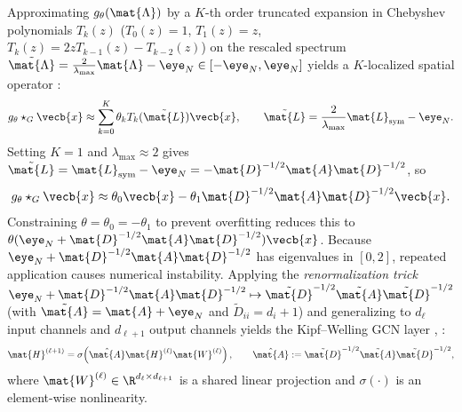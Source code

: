 \documentclass[../../../../master.tex]{subfiles}
\begin{document}
\begin{coremath}
\label{box:gnn:cheb_gcn}
Approximating $g_\theta(\mat{\Lambda})$ by a $K$-th order truncated expansion in Chebyshev polynomials $T_k(z)$ ($T_0(z)=1$, $T_1(z)=z$, $T_k(z)=2zT_{k-1}(z)-T_{k-2}(z)$) on the rescaled spectrum $\tilde{\mat{\Lambda}} = \frac{2}{\lambda_{\max}}\mat{\Lambda} - \eye_N \in [-\eye_N, \eye_N]$ yields a $K$-localized spatial operator :
\begin{equation}
  g_\theta \star_G \vecb{x} \approx \sum_{k=0}^K \theta_k T_k(\tilde{\mat{L}})\vecb{x}, \qquad \tilde{\mat{L}} = \frac{2}{\lambda_{\max}}\mat{L}_{\mathrm{sym}} - \eye_N. \label{eq:gnn:chebnet}
\end{equation}
Setting $K=1$ and $\lambda_{\max} \approx 2$ gives $\tilde{\mat{L}} = \mat{L}_{\mathrm{sym}} - \eye_N = -\mat{D}^{-1/2}\mat{A}\mat{D}^{-1/2}$, so
\begin{equation}
  g_\theta \star_G \vecb{x} \approx \theta_0 \vecb{x} - \theta_1 \mat{D}^{-1/2}\mat{A}\mat{D}^{-1/2}\vecb{x}.
\end{equation}
Constraining $\theta = \theta_0 = -\theta_1$ to prevent overfitting reduces this to $\theta(\eye_N + \mat{D}^{-1/2}\mat{A}\mat{D}^{-1/2})\vecb{x}$. Because $\eye_N + \mat{D}^{-1/2}\mat{A}\mat{D}^{-1/2}$ has eigenvalues in $[0, 2]$, repeated application causes numerical instability. Applying the \emph{renormalization trick} $\eye_N + \mat{D}^{-1/2}\mat{A}\mat{D}^{-1/2} \mapsto \tilde{\mat{D}}^{-1/2}\tilde{\mat{A}}\tilde{\mat{D}}^{-1/2}$ (with $\tilde{\mat{A}} = \mat{A} + \eye_N$ and $\tilde{D}_{ii} = d_i + 1$) and generalizing to $d_\ell$ input channels and $d_{\ell+1}$ output channels yields the Kipf--Welling GCN layer , :
\begin{equation}
  \mat{H}^{(\ell+1)} = \sigma\!\left(\hat{\mat{A}}\mat{H}^{(\ell)}\mat{W}^{(\ell)}\right), \qquad \hat{\mat{A}} := \tilde{\mat{D}}^{-1/2}\tilde{\mat{A}}\tilde{\mat{D}}^{-1/2}, \label{eq:gnn:gcn_layer}
\end{equation}
where $\mat{W}^{(\ell)} \in \R^{d_\ell \times d_{\ell+1}}$ is a shared linear projection and $\sigma(\cdot)$ is an element-wise nonlinearity.
\end{coremath}
\end{document}

